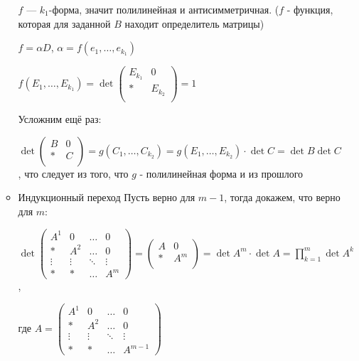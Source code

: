 \documentclass[twoside]{book}
\begin{document}
\begin{enumerate}
\begin{itemize}
                    \(f\) --- \(k_1\)-форма, значит полилинейная и антисимметричная. (\(f\) - функция, которая для заданной \(B\) находит определитель матрицы)

                    \(f =\alpha D\), \(\alpha = f(e_1, \ldots, e_{k_1})\)

                    \(f(E_1, \ldots, E_{k_1}) = \det\begin{pmatrix}
                        E_{k_1} & 0       \\
                        *       & E_{k_2} \\
                    \end{pmatrix} = 1\)


                    Усложним ещё раз:

                    \(\det\begin{pmatrix}
                        B & 0 \\
                        * & C \\
                    \end{pmatrix} = g(C_1,\ldots,C_{k_2}) = g(E_1,\ldots,E_{k_2})\cdot \det C = \det B \det C\), что следует из того, что \(g\) - полилинейная форма и из прошлого

              \item Индукционный переход
                    Пусть верно для \(m - 1\), тогда докажем, что верно для \(m\):

                    \(\det
                    \begin{pmatrix}
                        A^1    & 0      & \ldots & 0      \\
                        *      & A^2    & \ldots & 0      \\
                        \vdots & \vdots & \ddots & \vdots \\
                        *      & *      & \ldots & A^m
                    \end{pmatrix} = \begin{pmatrix}
                        A & 0   \\
                        * & A^m \\
                    \end{pmatrix} = \det A^m \cdot \det A = \prod\limits_{k=1}^m \det A^k \),

                    где
                    \(A =\begin{pmatrix}
                        A^1    & 0      & \ldots & 0       \\
                        *      & A^2    & \ldots & 0       \\
                        \vdots & \vdots & \ddots & \vdots  \\
                        *      & *      & \ldots & A^{m-1}
                    \end{pmatrix} \)
          \end{itemize}


\end{enumerate}
\end{document}
